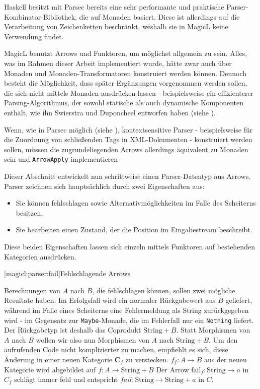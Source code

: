 \documentclass[a4paper, bibgerm]{book}
\newcommand\icode[1]{\lstinline?#1?}
\newcommand\lsubsection{}
\begin{document}
Haskell besitzt mit Parsec\cite{Parsec} bereits eine sehr
performante und praktische Parser-Kombinator-Bibliothek, die auf Monaden
basiert. Diese ist allerdings auf die Verarbeitung von Zeichenketten
beschränkt, weshalb sie in MagicL keine Verwendung findet. 

MagicL benutzt Arrows und Funktoren, um möglichst allgemein zu
sein. Alles, was im Rahmen dieser Arbeit implementiert wurde, hätte zwar
auch über Monaden und Monaden-Transformatoren konstruiert werden
können. Dennoch besteht die Möglichkeit, dass später Ergänzungen
vorgenommen werden sollen, die sich nicht mittels Monaden ausdrücken
lassen - beispielsweise ein effizienterer Parsing-Algorithmus, der
sowohl statische als auch dynamische Komponenten enthält, wie ihn
Swierstra und Duponcheel entworfen haben (siehe \cite[S. 8ff]{Hughes}).

Wenn, wie in Parsec möglich (siehe \cite[S. 3]{Parsec}),
kontextsensitive Parser - beispielsweise für die Zuordnung von
schließenden Tags in XML-Dokumenten - konstruiert werden sollen,
müssen die zugrundeliegenden Arrows allerdings äquivalent zu Monaden
sein und \icode{ArrowApply} implementieren

Dieser Abschnitt entwickelt nun schrittweise einen Parser-Datentyp aus
Arrows. Parser zeichnen sich hauptsächlich durch zwei Eigenschaften aus:
\begin{itemize}
\item Sie können fehlschlagen sowie Alternativmöglichkeiten im Falle des
  Scheiterns besitzen.
\item Sie bearbeiten einen Zustand, der die Position im Eingabestream
  beschreibt.
\end{itemize}
Diese beiden Eigenschaften lassen sich einzeln mittels Funktoren auf
bestehenden Kategorien ausdrücken.

\lsubsection[magicl:parser:fail]{Fehlschlagende Arrows}

Berechnungen von $A$ nach $B$, die fehlschlagen können, sollen zwei
mögliche Resultate haben. Im Erfolgsfall wird ein normaler Rückgabewert
aus $B$ geliefert, während im Falle eines Scheiterns eine Fehlermeldung
als String zurückgegeben wird - im Gegensatz zur \icode{Maybe}-Monade,
die im Fehlerfall nur ein \icode{Nothing} liefert. Der Rückgabetyp ist
deshalb das Coprodukt $\mathrm{String}+B$. Statt Morphismen von $A$ nach
$B$ wollen wir also nun Morphismen von $A$ nach $\mathrm{String}+B$. Um
den aufrufenden Code nicht komplizierter zu machen, empfiehlt es sich,
diese Änderung in einer neuen Kategorie $\mathbf{C}_f$ zu
verstecken. $f_{f} : A \rightarrow B$ aus der neuen Kategorie wird
abgebildet auf $f : A \rightarrow \mathrm{String} + B$ Der Arrow
$\mathrm{fail}_{f} : \mathrm{String} \rightarrow a$ in $C_{f}$ schlägt
immer fehl und entspricht $fail : \mathrm{String} \rightarrow
\mathrm{String} + a$ in $C$.
\end{document}
